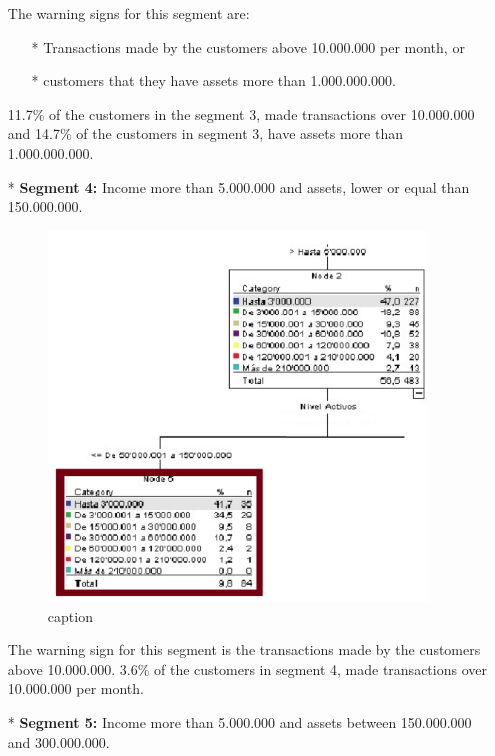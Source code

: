 \begin{itemize}
The warning signs for this segment are: \begin{itemize}
\item[*] Transactions made by the customers above 10.000.000 per month, or
\item[*] customers that they have assets more than 1.000.000.000.
\end{itemize}
11.7\% of the customers in the segment 3, made transactions over 10.000.000 and 14.7\% of the customers in segment 3, have assets more than 1.000.000.000.
\item[*] \textbf{Segment 4:}
Income more than 5.000.000 and assets, lower or equal than 150.000.000.
\begin{figure}[htbp]
  \centering
  \includegraphics[width=0.95\textwidth]{Segmento4}
  \caption{caption}
  \label{fig:label}
\end{figure}
The warning sign for this segment is the transactions made by the customers above 10.000.000.  3.6\% of the customers in segment 4, made transactions over 10.000.000 per month.
\item[*] \textbf{Segment 5:}
Income more than 5.000.000 and assets between 150.000.000 and 300.000.000.
\begin{figure}[htbp]
  \centering

\end{figure}
\end{itemize}
